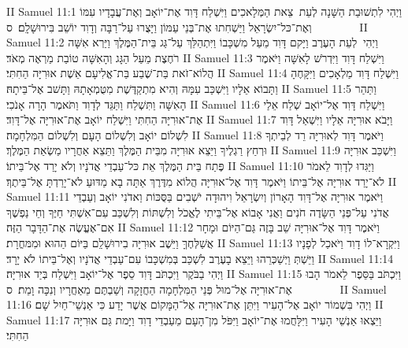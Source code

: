 II Samuel 11:1	וַיְהִי לִתְשׁוּבַת הַשָּׁנָה לְעֵת  צֵאת הַמְּלָאכִים וַיִּשְׁלַח דָּוִד אֶת־יוֹאָב וְאֶת־עֲבָדָיו עִמּוֹ וְאֶת־כּל־יִשְׂרָאֵל וַיַּשְׁחִתוּ אֶת־בְּנֵי עַמּוֹן וַיָּצֻרוּ עַל־רַבָּה וְדָוִד יוֹשֵׁב בִּירוּשָׁלָ͏ִם׃ {ס}        
II Samuel 11:2	וַיְהִי  לְעֵת הָעֶרֶב וַיָּקם דָּוִד מֵעַל מִשְׁכָּבוֹ וַיִּתְהַלֵּךְ עַל־גַּג בֵּית־הַמֶּלֶךְ וַיַּרְא אִשָּׁה רֹחֶצֶת מֵעַל הַגָּג וְהָאִשָּׁה טוֹבַת מַרְאֶה מְאֹד׃
II Samuel 11:3	וַיִּשְׁלַח דָּוִד וַיִּדְרֹשׁ לָאִשָּׁה וַיֹּאמֶר הֲלוֹא־זֹאת בַּת־שֶׁבַע בַּת־אֱלִיעָם אֵשֶׁת אוּרִיָּה הַחִתִּי׃
II Samuel 11:4	וַיִּשְׁלַח דָּוִד מַלְאָכִים וַיִּקָּחֶהָ וַתָּבוֹא אֵלָיו וַיִּשְׁכַּב עִמָּהּ וְהִיא מִתְקַדֶּשֶׁת מִטֻּמְאָתָהּ וַתָּשׁב אֶל־בֵּיתָהּ׃
II Samuel 11:5	וַתַּהַר הָאִשָּׁה וַתִּשְׁלַח וַתַּגֵּד לְדָוִד וַתֹּאמֶר הָרָה אָנֹכִי׃
II Samuel 11:6	וַיִּשְׁלַח דָּוִד אֶל־יוֹאָב שְׁלַח אֵלַי אֶת־אוּרִיָּה הַחִתִּי וַיִּשְׁלַח יוֹאָב אֶת־אוּרִיָּה אֶל־דָּוִד׃
II Samuel 11:7	וַיָּבֹא אוּרִיָּה אֵלָיו וַיִּשְׁאַל דָּוִד לִשְׁלוֹם יוֹאָב וְלִשְׁלוֹם הָעָם וְלִשְׁלוֹם הַמִּלְחָמָה׃
II Samuel 11:8	וַיֹּאמֶר דָּוִד לְאוּרִיָּה רֵד לְבֵיתְךָ וּרְחַץ רַגְלֶיךָ וַיֵּצֵא אוּרִיָּה מִבֵּית הַמֶּלֶךְ וַתֵּצֵא אַחֲרָיו מַשְׂאַת הַמֶּלֶךְ׃
II Samuel 11:9	וַיִּשְׁכַּב אוּרִיָּה פֶּתַח בֵּית הַמֶּלֶךְ אֵת כּל־עַבְדֵי אֲדֹנָיו וְלֹא יָרַד אֶל־בֵּיתוֹ׃
II Samuel 11:10	וַיַּגִּדוּ לְדָוִד לֵאמֹר לֹא־יָרַד אוּרִיָּה אֶל־בֵּיתוֹ וַיֹּאמֶר דָּוִד אֶל־אוּרִיָּה הֲלוֹא מִדֶּרֶךְ אַתָּה בָא מַדּוּעַ לֹא־יָרַדְתָּ אֶל־בֵּיתֶךָ׃
II Samuel 11:11	וַיֹּאמֶר אוּרִיָּה אֶל־דָּוִד הָאָרוֹן וְיִשְׂרָאֵל וִיהוּדָה יֹשְׁבִים בַּסֻּכּוֹת וַאדֹנִי יוֹאָב וְעַבְדֵי אֲדֹנִי עַל־פְּנֵי הַשָּׂדֶה חֹנִים וַאֲנִי אָבוֹא אֶל־בֵּיתִי לֶאֱכֹל וְלִשְׁתּוֹת וְלִשְׁכַּב עִם־אִשְׁתִּי חַיֶּךָ וְחֵי נַפְשֶׁךָ אִם־אֶעֱשֶׂה אֶת־הַדָּבָר הַזֶּה׃
II Samuel 11:12	וַיֹּאמֶר דָּוִד אֶל־אוּרִיָּה שֵׁב בָּזֶה גַּם־הַיּוֹם וּמָחָר אֲשַׁלְּחֶךָּ וַיֵּשֶׁב אוּרִיָּה בִירוּשָׁלַ͏ִם בַּיּוֹם הַהוּא וּמִמּחֳרָת׃
II Samuel 11:13	וַיִּקְרָא־לוֹ דָוִד וַיֹּאכַל לְפָנָיו וַיֵּשְׁתְּ וַיְשַׁכְּרֵהוּ וַיֵּצֵא בָעֶרֶב לִשְׁכַּב בְּמִשְׁכָּבוֹ עִם־עַבְדֵי אֲדֹנָיו וְאֶל־בֵּיתוֹ לֹא יָרָד׃
II Samuel 11:14	וַיְהִי בַבֹּקֶר וַיִּכְתֹּב דָּוִד סֵפֶר אֶל־יוֹאָב וַיִּשְׁלַח בְּיַד אוּרִיָּה׃
II Samuel 11:15	וַיִּכְתֹּב בַּסֵּפֶר לֵאמֹר הָבוּ אֶת־אוּרִיָּה אֶל־מוּל פְּנֵי הַמִּלְחָמָה הַחֲזָקָה וְשַׁבְתֶּם מֵאַחֲרָיו וְנִכָּה וָמֵת׃ {ס}        
II Samuel 11:16	וַיְהִי בִּשְׁמוֹר יוֹאָב אֶל־הָעִיר וַיִּתֵּן אֶת־אוּרִיָּה אֶל־הַמָּקוֹם אֲשֶׁר יָדַע כִּי אַנְשֵׁי־חַיִל שָׁם׃
II Samuel 11:17	וַיֵּצְאוּ אַנְשֵׁי הָעִיר וַיִּלָּחֲמוּ אֶת־יוֹאָב וַיִּפֹּל מִן־הָעָם מֵעַבְדֵי דָוִד וַיָּמת גַּם אוּרִיָּה הַחִתִּי׃
